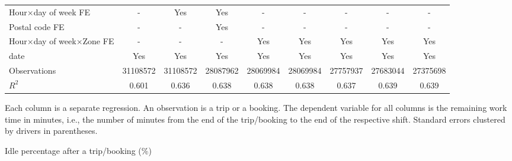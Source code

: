 \documentclass[reviewmode]{restat}
\begin{document}
\begin{appendices}
\begin{table}
{\begin{tabular}{l*{8}{S}}
            \addlinespace
            Hour\(\times\)day of week FE&         {-}         &       {Yes}         &       {Yes}         &         {-}         &         {-}         &         {-}         &         {-}         &         {-}         \\
            \addlinespace
            Postal code FE      &         {-}         &         {-}         &       {Yes}         &         {-}         &         {-}         &         {-}         &         {-}         &         {-}         \\
            \addlinespace
            Hour\(\times\)day of week\(\times\)Zone FE&         {-}         &         {-}         &         {-}         &       {Yes}         &       {Yes}         &       {Yes}         &       {Yes}         &       {Yes}         \\
            \addlinespace
            date                &       {Yes}         &       {Yes}         &       {Yes}         &       {Yes}         &       {Yes}         &       {Yes}         &       {Yes}         &       {Yes}         \\
            \midrule
            Observations        &\num{31108572}         &\num{31108572}         &\num{28087962}         &\num{28069984}         &\num{28069984}         &\num{27757937}         &\num{27683044}         &\num{27375698}         \\
            \(R^2\)             &     {0.601}         &     {0.636}         &     {0.638}         &     {0.638}         &     {0.638}         &     {0.637}         &     {0.639}         &     {0.639}         \\
            \bottomrule
            \end{tabular}
            }
 			\begin{tablenotes}
 				Each column is a separate regression. An observation is a trip or a booking. The dependent variable for all columns is the remaining work time in  minutes, i.e., the number of minutes from the end of the trip/booking to the end of the respective shift. Standard errors clustered by drivers in parentheses. 
 			\end{tablenotes}
 	\end{table}



\FloatBarrier

	\begin{table}[h]
 		\centering
 		\caption{Idle percentage after a trip/booking (\%)}
 		\label{tb:robustidle}
		

\end{table}
\end{appendices}
\end{document}
